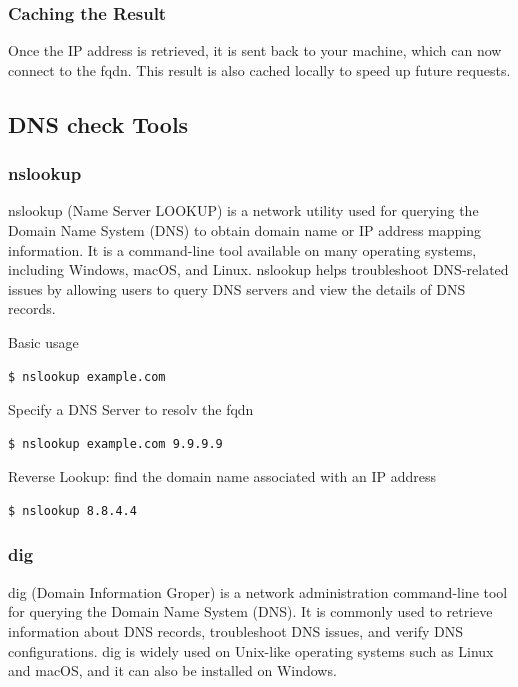 \documentclass{article}
\newenvironment{codetemplate}[1][]{%
  \mybasecolorbox[#1]
  \itshape
}{%
  \endmybasecolorbox
}
\begin{document}
\subsubsection{Caching the Result}
Once the IP address is retrieved, it is sent back to your machine, which can now connect to the fqdn. This result is also cached locally to speed up future requests.

\subsection{DNS check Tools}

\subsubsection{nslookup}

nslookup (Name Server LOOKUP) is a network utility used for querying the Domain Name System (DNS) to obtain domain name or IP address mapping information. It is a command-line tool available on many operating systems, including Windows, macOS, and Linux. nslookup helps troubleshoot DNS-related issues by allowing users to query DNS servers and view the details of DNS records.

Basic usage
\begin{codetemplate}{}
\begin{verbatim}
$ nslookup example.com
\end{verbatim}
\end{codetemplate}

Specify a DNS Server to resolv the fqdn
\begin{codetemplate}{}
\begin{verbatim}
$ nslookup example.com 9.9.9.9
\end{verbatim}
\end{codetemplate}

Reverse Lookup: find the domain name associated with an IP address
\begin{codetemplate}{}
\begin{verbatim}
$ nslookup 8.8.4.4
\end{verbatim}
\end{codetemplate}

\subsubsection{dig}

dig (Domain Information Groper) is a network administration command-line tool for querying the Domain Name System (DNS). It is commonly used to retrieve information about DNS records, troubleshoot DNS issues, and verify DNS configurations. dig is widely used on Unix-like operating systems such as Linux and macOS, and it can also be installed on Windows.
\end{document}
